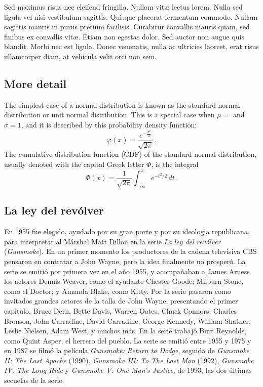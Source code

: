 \documentclass[11pt]{article} %
\begin{document}
Sed maximus risus nec eleifend fringilla. Nullam vit{\ae} lectus lorem. Nulla sed ligula vel nisi vestibulum sagittis. Quisque placerat fermentum commodo. Nullam sagittis mauris in purus pretium facilisis. Curabitur convallis mauris quam, sed finibus ex convallis vit{\ae}. Etiam non egestas dolor. Sed auctor non augue quis blandit. Morbi nec est ligula. Donec venenatis, nulla ac ultricies laoreet, erat risus ullamcorper diam, at vehicula velit orci non sem.

\subsection{More detail}

The simplest case of a normal distribution is known as the standard normal distribution or unit normal distribution. This is a special case when $\mu =$  and $\sigma = 1$, and it is described by this probability density function:
$$
    \varphi( x ) = \frac{
     \displaystyle e^{- \frac{ x^2}{2}}
     }{
      \displaystyle \sqrt{2 \pi}
     }\, .
$$
The cumulative distribution function (CDF) of the standard normal distribution, usually denoted with the capital Greek letter $\Phi$, is the integral
$$
 \Phi(x) = \frac{1}{\sqrt{2\pi}} \int_{-\infty}^x \! e^{-t^2\!/2}\, dt\, .
$$

\subsection{La ley del rev\'{o}lver}
 
En 1955 fue elegido, ayudado por su gran porte y por su ideolog\'{\i}a republicana, para interpretar al M\'{a}rshal Matt Dillon en la serie \textit{La ley del rev\'{o}lver} (\textit{Gunsmoke}).
En un primer momento los productores de la cadena televisiva CBS pensaron en contratar a John Wayne, pero la idea finalmente no prosper\'{o}. La serie se emiti\'{o} por primera vez en el a\~{n}o 1955, y acompa\~{n}aban a James Arness los actores Dennis Weaver, como el ayudante Chester Goode; Milburn Stone, como el Doctor; y Amanda Blake, como Kitty. Por la serie pasaron como invitados grandes actores de la talla de John Wayne, presentando el primer cap\'{\i}tulo, Bruce Dern, Bette Davis, Warren Oates, Chuck Connors, Charles Bronson, John Carradine, David Carradine, George Kennedy, William Shatner, Leslie Nielsen, Adam West, y muchos m\'{a}s.
En la serie trabaj\'{o} Burt Reynolds, como Quint Asper, el herrero del pueblo.
La serie se emiti\'{o} entre 1955 y 1975 y en 1987 se film\'{o} la película \textit{Gunsmoke: Return to Dodge}, seguida de \textit{Gunsmoke II: The Last Apache} (1990), \textit{Gunsmoke III: To The Last Man} (1992), \textit{Gunsmoke IV: The Long Ride} y \textit{Gunsmoke V: One Man's Justice}, de 1993, las dos \'{u}ltimas secuelas de la serie. 
\end{document}
